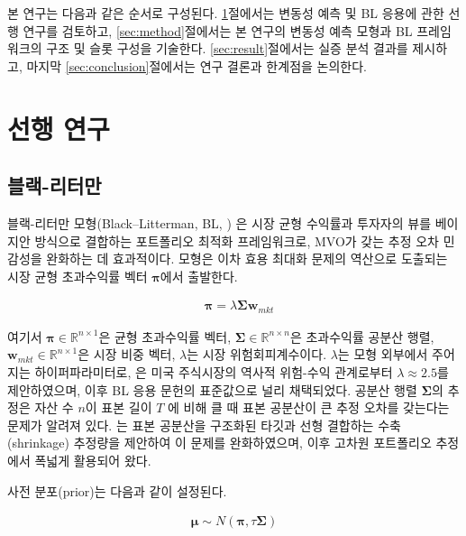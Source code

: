 \documentclass{article}
\begin{document}
본 연구는 다음과 같은 순서로 구성된다. \ref{sec:related_work}절에서는 변동성 예측 및 BL 응용에 관한 선행 연구를 검토하고, \ref{sec:method}절에서는 본 연구의 변동성 예측 모형과 BL 프레임워크의 구조 및 슬롯 구성을 기술한다. \ref{sec:result}절에서는 실증 분석 결과를 제시하고, 마지막 \ref{sec:conclusion}절에서는 연구 결론과 한계점을 논의한다.

\section{선행 연구}\label{sec:related_work}

\subsection{블랙-리터만}
\label{subsec:bl_review}

블랙-리터만 모형(Black–Litterman, BL, \citealp{black1992}) 은 시장 균형 수익률과 투자자의 뷰를 베이지안 방식으로 결합하는 포트폴리오 최적화 프레임워크로, MVO가 갖는 추정 오차 민감성을 완화하는 데 효과적이다. 모형은 이차 효용 최대화 문제의 역산으로 도출되는 시장 균형 초과수익률 벡터 $\boldsymbol{\pi}$에서 출발한다.

\begin{align}\label{eq:bl_pi}
    & \boldsymbol{\pi} = \lambda\boldsymbol{\Sigma}\mathbf{w}_{mkt}
\end{align}

여기서 $\boldsymbol{\pi} \in \mathbb{R}^{n \times 1}$은 균형 초과수익률 벡터, $\boldsymbol{\Sigma}\in \mathbb{R}^{n \times n}$은 초과수익률 공분산 행렬, $\mathbf{w}_{mkt} \in \mathbb{R}^{n \times 1}$은 시장 비중 벡터, $\lambda$는 시장 위험회피계수이다. $\lambda$는 모형 외부에서 주어지는 하이퍼파라미터로, \citet{helitterman1999}은 미국 주식시장의 역사적 위험-수익 관계로부터 $\lambda \approx 2.5$를 제안하였으며, 이후 BL 응용 문헌의 표준값으로 널리 채택되었다. 공분산 행렬 $\boldsymbol{\Sigma}$의 추정은 자산 수 $n$이 표본 길이 $T$ 에 비해 클 때 표본 공분산이 큰 추정 오차를 갖는다는 문제가 알려져 있다. \citet{ledoitwolf2004}는 표본 공분산을 구조화된 타깃과 선형 결합하는 수축(shrinkage) 추정량을 제안하여 이 문제를 완화하였으며, 이후 고차원 포트폴리오 추정에서 폭넓게 활용되어 왔다.

사전 분포(prior)는 다음과 같이 설정된다.

\begin{align}\label{eq:bl_mu}
    \boldsymbol{\mu} \sim N(\boldsymbol{\pi}, \tau\boldsymbol{\Sigma})
\end{align}
\end{document}
